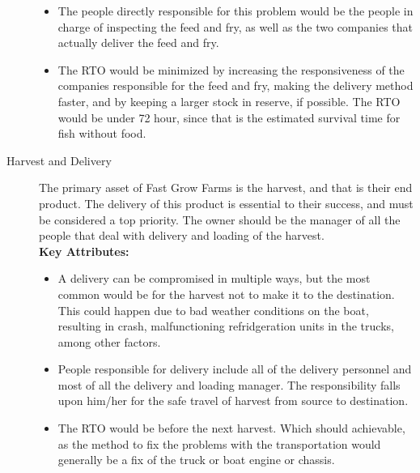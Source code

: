 \documentclass{article}
\numberwithin{equation}{section} %
\numberwithin{figure}{section} %
\numberwithin{table}{section} %
\begin{document}
\begin{description}
\begin{itemize}
		\item The people directly responsible for this problem would be the people in charge of inspecting the feed and fry, as well as the two companies that actually deliver the feed and fry.  
		\item The RTO would be minimized by increasing the responsiveness of the companies responsible for the feed and fry, making the delivery method faster, and by keeping a larger stock in reserve, if possible.  The RTO would be under 72 hour, since that is the estimated survival time for fish without food.
	\end{itemize}
	\item[Harvest and Delivery] The primary asset of Fast Grow Farms is the harvest, and that is their end product.  The delivery of this product is essential to their success, and must be considered a top priority.  The owner should be the manager of all the people that deal with delivery and loading of the harvest.\\
	\textbf{Key Attributes: }		
	\begin{itemize}
		\item A delivery can be compromised in multiple ways, but the most common would be for the harvest not to make it to the destination.  This could happen due to bad weather conditions on the boat, resulting in crash, malfunctioning refridgeration units in the trucks, among other factors.
		\item People responsible for delivery include all of the delivery personnel and most of all the delivery and loading manager.  The responsibility falls upon him/her for the safe travel of harvest from source to destination.  
		\item The RTO would be before the next harvest.  Which should achievable, as the method to fix the problems with the transportation would generally be a fix of the truck or boat engine or chassis.  
	\end{itemize}
\end{description}
\end{document}
